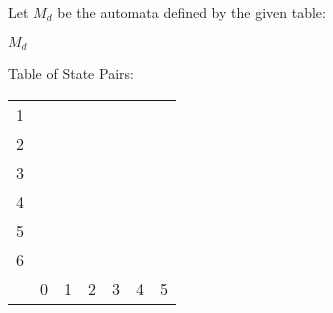 Let $M_d$ be the automata defined by the given table:
\begin{automata}{$M_d$}
	
	
	
	
	
	
	
	
	
\end{automata}

Table of State Pairs:
\begin{center} \begin{tabular}{*{7}{c|}}
									\cline{1-2}
	1 &                       \\	\cline{1-3}
	2 &   &                   \\	\cline{1-4}
	3 &   &   &               \\	\cline{1-5}
	4 &   &   &   &           \\	\cline{1-6}
	5 &   &   &   &   &       \\	\hline
	6 &   &   &   &   &   &   \\	\hline
	  & 0 & 1 & 2 & 3 & 4 & 5 \\	\hline
\end{tabular} \end{center}